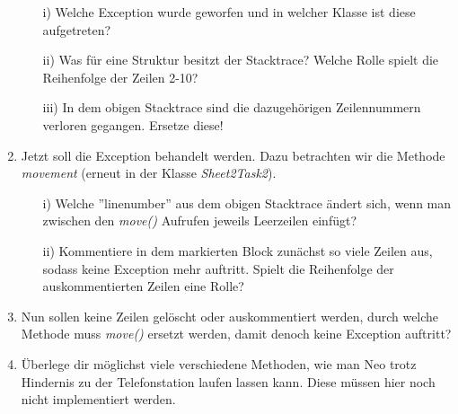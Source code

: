 \begin{enumerate}[label=\alph*)]
\begin{enumerate}
        \item[i)] Welche Exception wurde geworfen und in welcher Klasse ist diese aufgetreten?
        \item[ii)] Was für eine Struktur besitzt der Stacktrace? Welche Rolle spielt die Reihenfolge der Zeilen 2-10? 
        \item[iii)] In dem obigen Stacktrace sind die dazugehörigen Zeilennummern verloren gegangen. Ersetze diese!  
    \end{enumerate}
    \item Jetzt soll die Exception behandelt werden. Dazu betrachten wir die Methode \textit{movement} (erneut in der Klasse 
    \textit{Sheet2Task2}).
    \begin{enumerate}
        \item[i)] Welche ''linenumber'' aus dem obigen Stacktrace ändert sich, wenn man zwischen den \textit{move()} Aufrufen jeweils
        Leerzeilen einfügt?  
        \item[ii)] Kommentiere in dem markierten Block zunächst so viele Zeilen aus, sodass keine Exception mehr auftritt. 
        Spielt die Reihenfolge der auskommentierten Zeilen eine Rolle?
    \end{enumerate}
    \item  Nun sollen keine Zeilen gelöscht oder auskommentiert werden, durch welche Methode muss \textit{move()} ersetzt werden, damit 
    denoch keine Exception auftritt?
    \item Überlege dir möglichst viele verschiedene Methoden, wie man Neo trotz Hindernis zu der Telefonstation laufen lassen kann. 
    Diese müssen hier noch nicht implementiert werden.
\end{enumerate}
 
